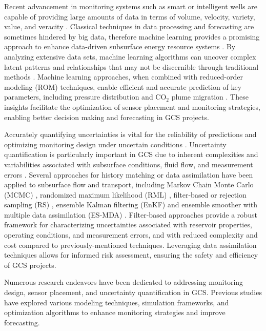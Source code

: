 \documentclass[a4paper,fleqn]{cas-sc}
\begin{document}
Recent advancement in monitoring systems such as smart or intelligent wells are capable of providing large amounts of data in terms of volume, velocity, variety, value, and veracity \citep{2021AGUFM.H25O1207S}. Classical techniques in data processing and forecasting are sometimes hindered by big data, therefore machine learning provides a promising approach to enhance data-driven subsurface energy resource systems \citep{Laloy2018381, Liu2019725}. By analyzing extensive data sets, machine learning algorithms can uncover complex latent patterns and relationships that may not be discernible through traditional methods \citep{Chen2016, Guo20182409}. Machine learning approaches, when combined with reduced-order modeling (ROM) techniques, enable efficient and accurate prediction of key parameters, including pressure distribution and CO$_2$ plume migration \citep{Wen2023Operators, Maldonado2021Unet}. These insights facilitate the optimization of sensor placement and monitoring strategies, enabling better decision making and forecasting in GCS projects.

Accurately quantifying uncertainties is vital for the reliability of predictions and optimizing monitoring design under uncertain conditions \citep{Wang2021, Chen2017328, Sun2019}. Uncertainty quantification is particularly important in GCS due to inherent complexities and variabilities associated with subsurface conditions, fluid flow, and measurement errors \citep{Jia2018104, Chen2020}. Several approaches for history matching or data assimilation have been applied to subsurface flow and transport, including Markov Chain Monte Carlo (MCMC) \citep{Emerick2012418, Chen2016, Chen2017328}, randomized maximum likelihood (RML) \citep{Chen20121}, filter-based or rejection sampling (RS) \citep{Caers2011}, ensemble Kalman filtering (EnKF) \citep{Chen2010579} and ensemble smoother with multiple data assimilation (ES-MDA) \citep{Rafiee2017, Chen2020}. Filter-based approaches provide a robust framework for characterizing uncertainties associated with reservoir properties, operating conditions, and measurement errors, and with reduced complexity and cost compared to previously-mentioned techniques. Leveraging data assimilation techniques allows for informed risk assessment, ensuring the safety and efficiency of GCS projects. 

Numerous research endeavors have been dedicated to addressing monitoring design, sensor placement, and uncertainty quantification in GCS. Previous studies have explored various modeling techniques, simulation frameworks, and optimization algorithms to enhance monitoring strategies and improve forecasting. 
\end{document}
